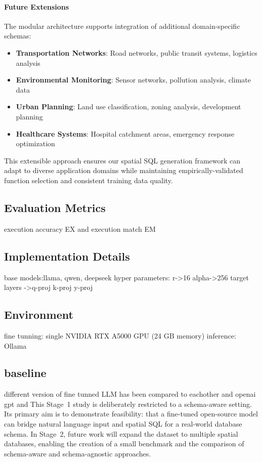 \paragraph{Future Extensions}
The modular architecture supports integration of additional domain-specific schemas:
\begin{itemize}
    \item \textbf{Transportation Networks}: Road networks, public transit systems, logistics analysis
    \item \textbf{Environmental Monitoring}: Sensor networks, pollution analysis, climate data
    \item \textbf{Urban Planning}: Land use classification, zoning analysis, development planning
    \item \textbf{Healthcare Systems}: Hospital catchment areas, emergency response optimization
\end{itemize}

This extensible approach ensures our spatial SQL generation framework can adapt to diverse application domains while maintaining empirically-validated function selection and consistent training data quality.


\subsection{Evaluation Metrics} execution accuracy EX and execution match EM

\subsection{Implementation Details} base models:llama, qwen, deepseek
hyper parameters: r->16 alpha->256
target layers ->q-proj k-proj y-proj

\subsection{Environment} fine tunning: single NVIDIA RTX A5000 GPU (24 GB memory)
inference: Ollama


\subsection{baseline} different version of fine tunned LLM has been compared to eachother and openai gpt and 
This Stage~1 study is deliberately restricted to a schema-aware setting. Its primary aim is to demonstrate feasibility: that a fine-tuned open-source model can bridge natural language input and spatial SQL for a real-world database schema. In Stage~2, future work will expand the dataset to multiple spatial databases, enabling the creation of a small benchmark and the comparison of schema-aware and schema-agnostic approaches.